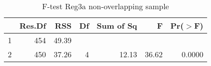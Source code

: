\begin{table}[htbp!]
\centering
\caption{F-test Reg3a non-overlapping sample} 
\label{tab:ftest1over}
\begin{tabular}{lrrrrrr}
  \hline
 & Res.Df & RSS & Df & Sum of Sq & F & Pr($>$F) \\ 
  \hline
1 & 454 & 49.39 &  &  &  &  \\ 
  2 & 450 & 37.26 & 4 & 12.13 & 36.62 & 0.0000 \\ 
   \hline
\end{tabular}
\end{table}
